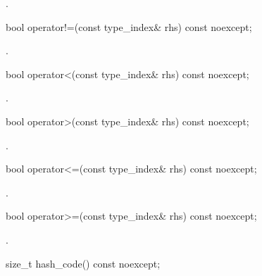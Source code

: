 \begin{itemdescr}
\pnum
\returns {}.
\end{itemdescr}

%
\begin{itemdecl}
bool operator!=(const type_index& rhs) const noexcept;
\end{itemdecl}

\begin{itemdescr}
\pnum
\returns {}.
\end{itemdescr}

%
\begin{itemdecl}
bool operator<(const type_index& rhs) const noexcept;
\end{itemdecl}

\begin{itemdescr}
\pnum
\returns {}.
\end{itemdescr}

%
\begin{itemdecl}
bool operator>(const type_index& rhs) const noexcept;
\end{itemdecl}

\begin{itemdescr}
\pnum
\returns {}.
\end{itemdescr}

%
\begin{itemdecl}
bool operator<=(const type_index& rhs) const noexcept;
\end{itemdecl}

\begin{itemdescr}
\pnum
\returns {}.
\end{itemdescr}

%
\begin{itemdecl}
bool operator>=(const type_index& rhs) const noexcept;
\end{itemdecl}

\begin{itemdescr}
\pnum
\returns {}.
\end{itemdescr}

%
\begin{itemdecl}
size_t hash_code() const noexcept;
\end{itemdecl}


